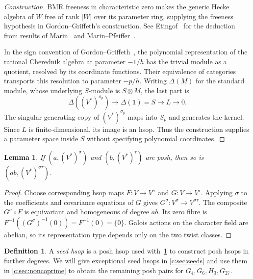 \documentclass[10pt,a4paper]{amsart}
\newcommand{\defn}[1]{\emph{\color{darkblue}#1}}
\newtheorem{lemma}[theorem]{Lemma}
\theoremstyle{definition}
\newtheorem{definition}[theorem]{Definition}
\begin{document}
\begin{proof}[Construction]
BMR freeness in characteristic zero makes the generic Hecke algebra
of $W$ free of rank $|W|$ over its parameter ring, supplying the
freeness hypothesis in Gordon--Griffeth's construction. See
Etingof~\cite[Theorem~1.3]{Etingof} for the deduction from results of
Marin~\cite{MarinCubic,MarinFreeness} and
Marin--Pfeiffer~\cite[Theorem~1.2]{MarinPfeiffer}.

In the sign convention of Gordon--Griffeth~\cite[Sections~2.9--2.11]{GG},
the polynomial representation of the rational Cherednik algebra at
parameter $-1/h$ has the trivial module as a quotient, resolved by
its coordinate functions. Their equivalence of categories transports
this resolution to parameter $-p/h$. Writing $\Delta(M)$ for the
standard module, whose underlying $S$-module is $S\otimes M$, the last
part is
\[
 \Delta((V^*)^{\sigma_p})\longrightarrow
 \Delta(\mathbf1)=S\longrightarrow L\longrightarrow0.
\]
The singular generating copy of $(V^*)^{\sigma_p}$ maps into $S_p$
and generates the kernel. Since $L$ is finite-dimensional, its image
is an hsop. Thus the construction supplies a parameter space inside
$S$ without specifying polynomial coordinates.
\end{proof}

\begin{lemma}\label{c:lem:composition}
If $(a,(V^*)^\sigma)$ and $(b,(V^*)^\tau)$ are posh, then so is
$(ab,(V^*)^{\sigma\tau})$.
\end{lemma}
\begin{proof}
Choose corresponding hsop maps $F:V\to V^\sigma$ and $G:V\to V^\tau$.
Applying $\sigma$ to the coefficients and covariance equations of $G$
gives $G^\sigma:V^\sigma\to V^{\sigma\tau}$. The composite
$G^\sigma\circ F$ is equivariant and homogeneous of degree $ab$.
Its zero fibre is $F^{-1}((G^\sigma)^{-1}(0))=F^{-1}(0)=\{0\}$.
Galois actions on the character field are abelian, so its representation
type depends only on the two twist classes.
\end{proof}

\begin{definition}\label{b:def:seed}
A \defn{seed hsop} is a posh hsop used with~\cref{c:lem:composition}
to construct posh hsops in further degrees. We will give exceptional seed
hsops in \cref{c:sec:seeds} and use them in \cref{c:sec:noncoprime}
to obtain the remaining posh pairs for
$G_4,G_6,H_3,G_{27}$.
\end{definition}
\end{document}

